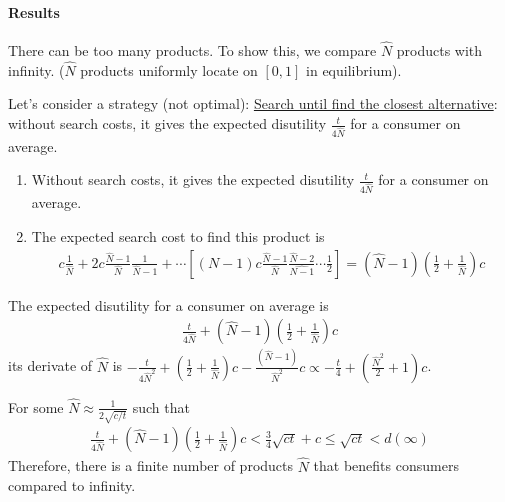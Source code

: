 \documentclass[11pt]{elegantbook}
\begin{document}
\paragraph*{Results} There can be too many products. To show this, we compare $\hat{N}$ products with infinity. ($\hat{N}$ products uniformly locate on $[0,1]$ in equilibrium).

Let's consider a strategy (not optimal): \underline{Search until find the closest alternative}: without search costs, it gives the expected disutility $\frac{t}{4\hat{N}}$ for a consumer on average.
\begin{enumerate}
    \item Without search costs, it gives the expected disutility $\frac{t}{4\hat{N}}$ for a consumer on average.
    \item The expected search cost to find this product is
    \begin{equation}
        \begin{aligned}
            c\frac{1}{\hat{N}}+2c\frac{\hat{N}-1}{\hat{N}}\frac{1}{\hat{N}-1}+\cdots \left[(N-1)c\frac{\hat{N}-1}{\hat{N}}\frac{\hat{N}-2}{\hat{N-1}}\cdots\frac{1}{2}\right]=(\hat{N}-1)\left(\frac{1}{2}+\frac{1}{\hat{N}}\right)c
        \end{aligned}
        \nonumber
    \end{equation}
\end{enumerate}
The expected disutility for a consumer on average is
\begin{equation}
    \begin{aligned}
        \frac{t}{4\hat{N}}+(\hat{N}-1)\left(\frac{1}{2}+\frac{1}{\hat{N}}\right)c
    \end{aligned}
    \nonumber
\end{equation}
its derivate of $\hat{N}$ is $-\frac{t}{4\hat{N}^2}+\left(\frac{1}{2}+\frac{1}{\hat{N}}\right)c-\frac{(\hat{N}-1)}{\hat{N}^2}c\propto -\frac{t}{4}+\left(\frac{\hat{N}^2}{2}+1\right)c$.

For some $\hat{N}\approx \frac{1}{2\sqrt{c/t}}$ such that
\begin{equation}
    \begin{aligned}
        \frac{t}{4\hat{N}}+(\hat{N}-1)\left(\frac{1}{2}+\frac{1}{\hat{N}}\right)c<\frac{3}{4}\sqrt{ct}+c\leq \sqrt{ct}<d(\infty)
    \end{aligned}
    \nonumber
\end{equation}
Therefore, there is a finite number of products $\hat{N}$ that benefits consumers compared to infinity.
\end{document}
